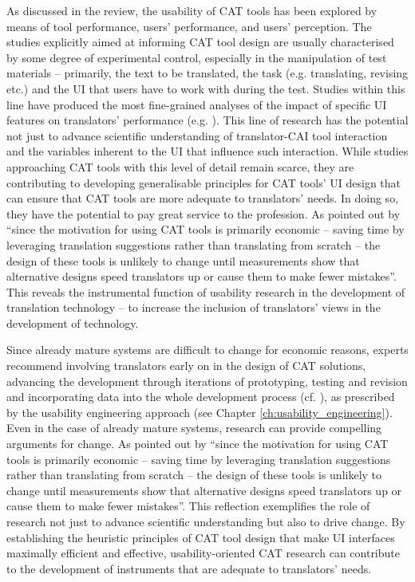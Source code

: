 As discussed in the review, the usability of CAT tools has been explored by means of tool performance, users’ performance, and users’ perception. The studies explicitly aimed at informing CAT tool design are usually characterised by some degree of experimental control, especially in the manipulation of test materials -- primarily, the text to be translated, the task (e.g. translating, revising etc.) and the UI that users have to work with during the test. Studies within this line have produced the most fine-grained analyses of the impact of specific UI features on translators’ performance (e.g. \cite{laubli2020machine}). This line of research has the potential not just to advance scientific understanding of translator-CAI tool interaction and the variables inherent to the UI that influence such interaction. While studies approaching CAT tools with this level of detail remain scarce, they are contributing to developing generalisable principles for CAT tools’ UI design that can ensure that CAT tools are more adequate to translators’ needs. In doing so, they have the potential to pay great service to the profession. As pointed out by \citet[1]{laubli2020machine} ``since the motivation for using CAT tools is primarily economic – saving time by leveraging translation suggestions rather than translating from scratch – the design of these tools is unlikely to change until measurements show that alternative designs speed translators up or cause them to make fewer mistakes''. This reveals the instrumental function of usability research in the development of translation technology -- to increase the inclusion of translators’ views in the development of technology.

Since already mature systems are difficult to change for economic reasons, experts recommend involving translators early on in the design of CAT solutions, advancing the development through iterations of prototyping, testing and revision and incorporating data into the whole development process (cf. \cite{laubli2019translation}), as prescribed by the usability engineering approach (see Chapter \ref{ch:usability_engineering}). Even in the case of already mature systems, research can provide compelling arguments for change. As pointed out by \citet[1]{laubli2020machine} ``since the motivation for using CAT tools is primarily economic – saving time by leveraging translation suggestions rather than translating from scratch – the design of these tools is unlikely to change until measurements show that alternative designs speed translators up or cause them to make fewer mistakes''. This reflection exemplifies the role of research not just to advance scientific understanding but also to drive change. By establishing the heuristic principles of CAT tool design that make UI interfaces maximally efficient and effective, usability-oriented CAT research can contribute to the development of instruments that are adequate to translators’ needs.
